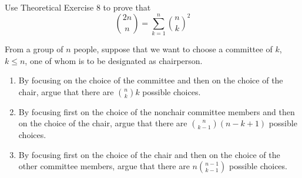 \documentclass[12pt]{article}
\newenvironment{problem}[2][Problem]{\begin{trivlist}
\item[\hskip \labelsep {\bfseries #1}\hskip \labelsep {\bfseries #2.}]}{\end{trivlist}}
\begin{document}
\begin{problem}{ 1.T.9  }
Use Theoretical Exercise 8 to prove that \[ { 2n \choose n} = \sum_{k=1}^n { n\choose k}^2 \]
\end{problem}

\begin{problem}{  1.T.10}
From a group of $n$ people, suppose that we want to choose a committee of $k$, $k\leq n$, one of whom is to be designated as chairperson.
\begin{enumerate}[label=(\alph*)]
	\item By focusing on the choice of the committee and then on the choice of the chair, argue that there are ${ n \choose k} k$ possible choices.
	\item By focusing first on the choice of the nonchair committee members and then on the choice of the chair, argue that there are ${n \choose k-1}\left(n-k+1\right)$ possible choices.
	\item By focusing first on the choice of the chair and then on the choice of the other committee members, argue that there are $n{ n-1 \choose k-1}$ possible choices.
\end{enumerate}
\end{problem}






\end{document}

